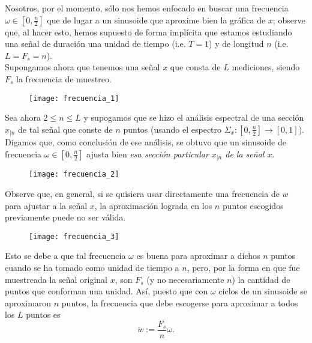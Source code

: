 Nosotros, por el momento, sólo nos
hemos enfocado en buscar
una frecuencia $\omega \in [0, \frac{n}{2}]$ que de lugar
a un sinusoide que aproxime bien la gráfica
de $x$;
observe que, al hacer esto, hemos supuesto de forma
implícita que estamos estudiando una señal
de duración una unidad de tiempo
(i.e. $T = 1$) y de longitud $n$
(i.e. $L = F_{s} = n$). \\
Supongamos ahora que
tenemos una señal $x$ que consta de $L$ mediciones, siendo
$F_{s}$ la frecuencia de muestreo.
\begin{figure}[H]
	\centering
	\texttt{[image: frecuencia\_1]} 
\end{figure}	

Sea ahora $2 \leq n \leq L$ y
supogamos que
se hizo el análisis
espectral 
de una sección $x_{|n}$ de tal señal
que conste de $n$ puntos
(usando el espectro
$\Sigma_{x}: [0, \frac{n}{2}]
\longrightarrow [0,1]$).
Digamos que, como conclusión de ese análisis, se
obtuvo que un sinusoide de frecuencia $\omega \in [0, \frac{n}{2}]$
ajusta bien \textit{esa sección particular 
$x_{|n}$
de la señal $x$}.
\begin{figure}[H]
	\centering
	\texttt{[image: frecuencia\_2]} 
\end{figure}	

Observe que, en general, si se quisiera usar
directamente una frecuencia de $w$ para ajustar
a la señal $x$, la aproximación lograda en los
$n$ puntos escogidos previamente puede no ser válida.
\begin{figure}[H]
	\centering
	\texttt{[image: frecuencia\_3]} 
\end{figure}
Esto se debe a que	
tal frecuencia $\omega$ es buena para aproximar
a dichos $n$ puntos cuando se ha tomado como
unidad de tiempo a $n$, pero, 
por la forma en que fue muestreada la señal original $x$,
son $F_{s}$ (y no necesariamente $n$) la cantidad de puntos
que conforman una unidad. Así, puesto que con $\omega$
ciclos de un sinusoide se aproximaron $n$ puntos, 
la frecuencia que debe escogerse para aproximar a todos los $L$
puntos es
\begin{equation}
\label{eq: rel frecuencia real y ficticia}
\tilde{w} := \frac{F_{s}}{n} \omega.
\end{equation}

